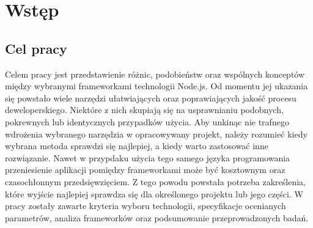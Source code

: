 \documentclass[12pt]{report}
\begin{document}
\tableofcontents
\chapter{Wstęp}

  \section{Cel pracy}
    Celem pracy jest przedstawienie różnic, podobieństw oraz wspólnych konceptów między wybranymi frameworkami technologii Node.js.
    Od momentu jej ukazania się powstało wiele narzędzi ułatwiających oraz poprawiających jakość procesu deweloperskiego.
    Niektóre z nich skupiają się na usprawnianiu podobnych, pokrewnych lub identycznych przypadków użycia.
    Aby unkinąc nie trafnego wdrożenia wybranego narzędzia w opracowywany projekt, należy rozumieć kiedy wybrana metoda sprawdzi się najlepiej, a kiedy warto zastosować inne rozwiązanie.
    Nawet w przypdaku użycia tego samego języka programowania przeniesienie aplikacji pomiędzy frameworkami może być kosztownym oraz czasochłonnym przedsięwzięciem.
    Z tego powodu powstała potrzeba zakreślenia, które wyjście najlepiej sprawdza się dla określonego projektu lub jego części.
    W pracy zostały zawarte kryteria wyboru technologii, specyfikacje ocenianych parametrów, analiza frameworków oraz podsumowanie przeprowadzonych badań.
\end{document}
